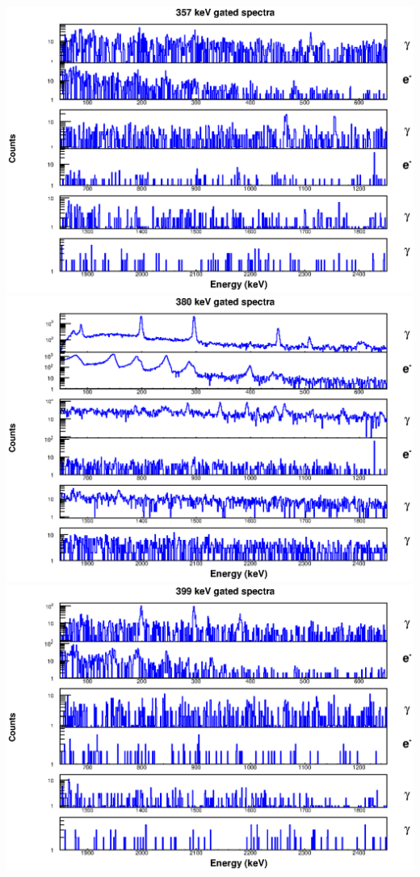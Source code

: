 \includegraphics[scale=0.8]{156Gd_Appendix/357_combined.eps}
\includegraphics[scale=0.8]{156Gd_Appendix/380_combined.eps}
\includegraphics[scale=0.8]{156Gd_Appendix/399_combined.eps}
